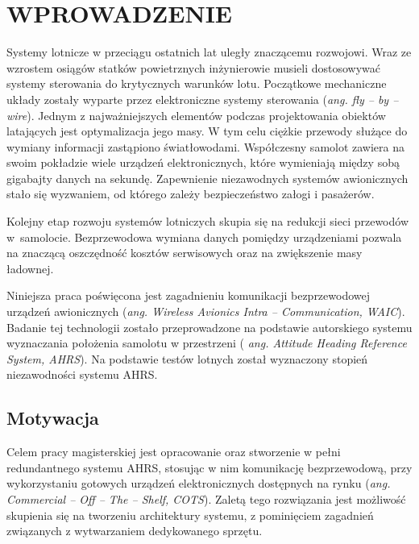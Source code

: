 \documentclass[a4paper, 12pt, twoside]{article}
\begin{document}
\tableofcontents

\newpage
\justify

\vspace*{1.5 cm}
\section{WPROWADZENIE}
\vspace{3.0 cm}
Systemy lotnicze w przeciągu ostatnich lat uległy znaczącemu rozwojowi. Wraz ze wzrostem osiągów statków powietrznych inżynierowie musieli dostosowywać systemy sterowania do krytycznych warunków lotu. Początkowe mechaniczne układy zostały wyparte przez elektroniczne systemy sterowania (\textit {ang. fly -- by -- wire}). Jednym z najważniejszych elementów podczas projektowania obiektów latających jest optymalizacja jego masy. W tym celu ciężkie przewody służące do wymiany informacji zastąpiono światłowodami. Współczesny samolot zawiera na swoim pokładzie wiele urządzeń elektronicznych, które wymieniają między sobą gigabajty danych na sekundę. Zapewnienie niezawodnych systemów awionicznych stało się wyzwaniem, od którego zależy bezpieczeństwo załogi i pasażerów.

Kolejny etap rozwoju systemów lotniczych skupia się na redukcji sieci przewodów w~samolocie. Bezprzewodowa wymiana danych pomiędzy urządzeniami pozwala na znaczącą oszczędność kosztów serwisowych oraz na zwiększenie masy ładownej.

Niniejsza praca poświęcona jest zagadnieniu komunikacji bezprzewodowej urządzeń awionicznych (\textit {ang. Wireless Avionics Intra -- Communication, WAIC}). Badanie tej technologii zostało przeprowadzone na podstawie autorskiego systemu wyznaczania położenia samolotu w przestrzeni ( \textit {ang. Attitude Heading Reference System, AHRS}). Na podstawie testów lotnych został wyznaczony stopień niezawodności systemu AHRS.


\vspace{1.0 cm}
\subsection{Motywacja}
Celem pracy magisterskiej jest opracowanie oraz stworzenie w pełni redundantnego systemu AHRS, stosując w nim komunikację bezprzewodową, przy wykorzystaniu gotowych urządzeń elektronicznych dostępnych na rynku (\textit {ang. Commercial -- Off -- The -- Shelf, COTS}). Zaletą tego rozwiązania jest możliwość skupienia się na tworzeniu architektury systemu, z pominięciem zagadnień związanych z wytwarzaniem dedykowanego sprzętu. 
\end{document}
